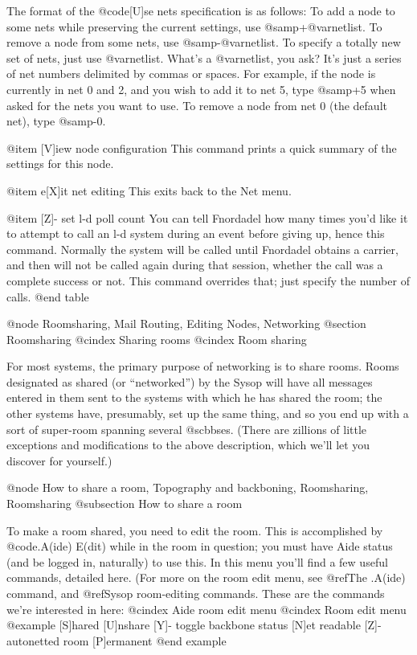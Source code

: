 The format of the @code{[U]se nets} specification is as follows:
To add a node to some nets while preserving the current settings,
use @samp{+@var{netlist}}.  To remove a node from some nets, use
@samp{-@var{netlist}}.
To specify a totally new set of nets, just use @var{netlist}.  What's
a @var{netlist}, you ask?  It's just a series of net numbers delimited
by commas or spaces.  For example, if the node is currently in
net 0 and 2, and you wish to add it to net 5, type @samp{+5} when asked
for the nets you want to use.  To remove a node from net 0 (the
default net), type @samp{-0}.

@item [V]iew node configuration
This command prints a quick summary of the settings for
this node.

@item e[X]it net editing
This exits back to the Net menu.

@item [Z]- set l-d poll count
You can tell Fnordadel how many times you'd like it
to attempt to call an l-d system during an event before giving
up, hence this command.  Normally the system will be called
until Fnordadel obtains a carrier, and then will not be
called again during that session, whether the call was a
complete success or not.  This command overrides that; just
specify the number of calls.
@end table

@node Roomsharing, Mail Routing, Editing Nodes, Networking
@section Roomsharing
@cindex Sharing rooms
@cindex Room sharing

For most systems, the primary purpose of networking is to share
rooms.  Rooms designated as shared (or ``networked'') by the Sysop will
have all messages entered in them sent to the systems with which he has
shared the room; the other systems have, presumably, set up the same
thing, and so you end up with a sort of super-room spanning several
@sc{bbs}es.  (There are zillions of little exceptions and modifications to the
above description, which we'll let you discover for yourself.)

@node How to share a room, Topography and backboning, Roomsharing, Roomsharing
@subsection How to share a room

To make a room shared, you need to edit the room.  This
is accomplished by @code{.A(ide) E(dit)} while in the room in question;
you must have Aide status (and be logged in, naturally) to use this.  In
this menu you'll find a few useful commands, detailed here.
(For more on the room edit menu, see @ref{The .A(ide) command}, and
@ref{Sysop room-editing commands}.  These are the commands we're
interested in here:
@cindex Aide room edit menu
@cindex Room edit menu
@example
[S]hared
[U]nshare
[Y]- toggle backbone status
[N]et readable
[Z]- autonetted room
[P]ermanent
@end example

